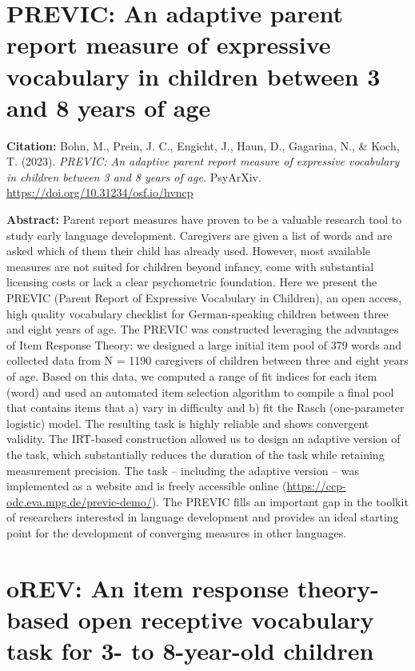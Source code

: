 \documentclass[
]{scrbook}
\begin{document}
\section{PREVIC: An adaptive parent report measure of expressive vocabulary in children between 3 and 8 years of age}\label{previc-an-adaptive-parent-report-measure-of-expressive-vocabulary-in-children-between-3-and-8-years-of-age}

\textbf{Citation:} Bohn, M., Prein, J. C., Engicht, J., Haun, D., Gagarina, N., \& Koch, T. (2023). \emph{PREVIC: An adaptive parent report measure of expressive vocabulary in children between 3 and 8 years of age.} PsyArXiv. \url{https://doi.org/10.31234/osf.io/hvncp}

\textbf{Abstract:} Parent report measures have proven to be a valuable research tool to study early language development. Caregivers are given a list of words and are asked which of them their child has already used. However, most available measures are not suited for children beyond infancy, come with substantial licensing costs or lack a clear psychometric foundation. Here we present the PREVIC (Parent Report of Expressive Vocabulary in Children), an open access, high quality vocabulary checklist for German-speaking children between three and eight years of age. The PREVIC was constructed leveraging the advantages of Item Response Theory: we designed a large initial item pool of 379 words and collected data from N = 1190 caregivers of children between three and eight years of age. Based on this data, we computed a range of fit indices for each item (word) and used an automated item selection algorithm to compile a final pool that contains items that a) vary in difficulty and b) fit the Rasch (one-parameter logistic) model. The resulting task is highly reliable and shows convergent validity. The IRT-based construction allowed us to design an adaptive version of the task, which substantially reduces the duration of the task while retaining measurement precision. The task -- including the adaptive version -- was implemented as a website and is freely accessible online (\url{https://ccp-odc.eva.mpg.de/previc-demo/}). The PREVIC fills an important gap in the toolkit of researchers interested in language development and provides an ideal starting point for the development of converging measures in other languages.

\newpage

\section{oREV: An item response theory-based open receptive vocabulary task for 3- to 8-year-old children}\label{orev-an-item-response-theory-based-open-receptive-vocabulary-task-for-3--to-8-year-old-children}
\end{document}
